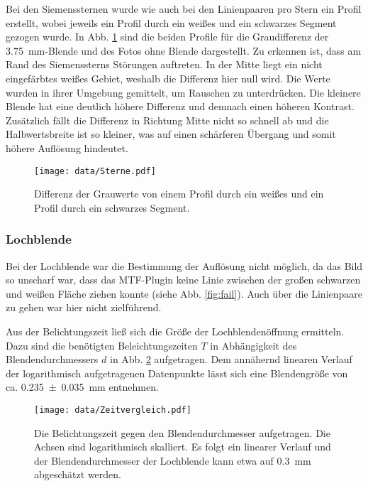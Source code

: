 			Bei den Siemenssternen wurde wie auch bei den Linienpaaren pro Stern ein Profil erstellt, wobei jeweils ein Profil durch ein weißes und ein schwarzes Segment gezogen wurde.
			In Abb. \ref{fig:Sterne1} sind die beiden Profile für die Graudifferenz der \SI{3.75}{\milli\meter}-Blende und des Fotos ohne Blende dargestellt.	
			Zu erkennen ist, dass am Rand des Siemenssterns Störungen auftreten.
			In der Mitte liegt ein nicht eingefärbtes weißes Gebiet, weshalb die Differenz hier null wird.
			Die Werte wurden in ihrer Umgebung gemittelt, um Rauschen zu unterdrücken.
			Die kleinere Blende hat eine deutlich höhere Differenz und demnach einen höheren Kontrast.
			Zusätzlich fällt die Differenz in Richtung Mitte nicht so schnell ab und die Halbwertsbreite ist so kleiner, was auf einen schärferen Übergang und somit höhere Auflösung hindeutet.	
			\begin{figure}[ht]
				\centering
				\texttt{[image: data/Sterne.pdf]}
				\caption{Differenz der Grauwerte von einem Profil durch ein weißes und ein Profil durch ein schwarzes Segment.}
				\label{fig:Sterne1}	
			\end{figure}
		
		\subsubsection{Lochblende}
			
			Bei der Lochblende war die Bestimmung der Auflösung nicht möglich, da das Bild so unscharf war, dass das MTF-Plugin keine Linie zwischen der großen schwarzen und weißen Fläche ziehen konnte (siehe Abb. \ref{fig:fail}).
			Auch über die Linienpaare zu gehen war hier nicht zielführend.
			
			Aus der Belichtungszeit ließ sich die Größe der Lochblendenöffnung ermitteln.
			Dazu sind die benötigten Beleichtungszeiten $T$ in Abhängigkeit des Blendendurchmessers $d$ in Abb. \ref{fig:Belichtung} aufgetragen.
			Dem annähernd linearen Verlauf der logarithmisch aufgetragenen Datenpunkte lässt sich eine Blendengröße von ca. \SI{0,235+-0,035}{\milli\meter} entnehmen.
			\begin{figure}[ht]
				\centering
				\texttt{[image: data/Zeitvergleich.pdf]}
				\caption{Die Belichtungszeit gegen den Blendendurchmesser aufgetragen. Die Achsen sind logarithmisch skalliert. Es folgt ein linearer Verlauf und der Blendendurchmesser der Lochblende kann etwa auf \SI{0.3}{\milli\meter} abgeschätzt werden.}
				\label{fig:Belichtung}	
			\end{figure}

